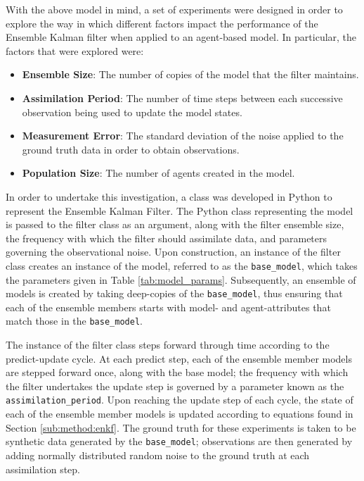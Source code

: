 With the above model in mind, a set of experiments were designed in order to
explore the way in which different factors impact the performance of the
Ensemble Kalman filter when applied to an agent-based model.
In particular, the factors that were explored were:
\begin{itemize}
    \item \textbf{Ensemble Size}: The number of copies of the model that the
        filter maintains.
    \item \textbf{Assimilation Period}: The number of time steps between each
        successive observation being used to update the model states.
    \item \textbf{Measurement Error}: The standard deviation of the noise
        applied to the ground truth data in order to obtain observations.
    \item \textbf{Population Size}: The number of agents created in the model.
\end{itemize}

In order to undertake this investigation, a class was developed in Python to
represent the Ensemble Kalman Filter.
The Python class representing the model is passed to the filter class as an
argument, along with the filter ensemble size, the frequency with which the
filter should assimilate data, and parameters governing the observational noise.
Upon construction, an instance of the filter class creates an instance of the
model, referred to as the \texttt{base\_model}, which takes the parameters given
in Table \ref{tab:model_params}.
Subsequently, an ensemble of models is created by taking deep-copies of the
\texttt{base\_model}, thus ensuring that each of the ensemble members starts
with model- and agent-attributes that match those in the \texttt{base\_model}.

The instance of the filter class steps forward through time according to the
predict-update cycle.
At each predict step, each of the ensemble member models are stepped forward
once, along with the base model; the frequency with which the filter undertakes
the update step is governed by a parameter known as the
\texttt{assimilation\_period}.
Upon reaching the update step of each cycle, the state of each of the ensemble
member models is updated according to equations found in Section
\ref{sub:method:enkf}.
The ground truth for these experiments is taken to be synthetic data generated
by the \texttt{base\_model}; observations are then generated by adding normally
distributed random noise to the ground truth at each assimilation step.

